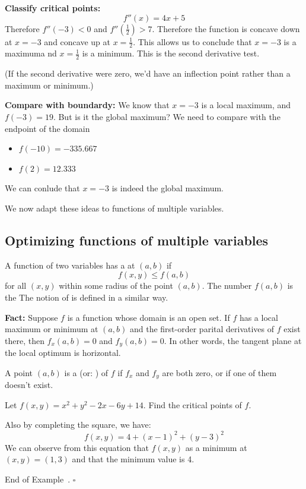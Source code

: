 \documentclass[10pt]{article}
\theoremstyle{definition}
\newtheorem{example}[theorem]{Example}
\renewenvironment{example}
{\begin{oldexample}}
  {\par\smallskip\hfill   End of Example~\theexample. $\square$    \par\end{oldexample}}
\newcommand{\vt}{\vskip 5mm} %
\newcommand{\Fl}{\vt\noindent\textbf} %
\newcommand{\1}[1]{\textbf{1}_{\left[#1\right]}} %
\newcommand{\dempfcolor}[1]{{\color{RoyalBlue}#1}}
\newcommand{\demph}[1]{\dempfcolor{{\sl #1}}}
\begin{document}
\Fl{Classify critical points:}
\begin{equation*}
  f''(x) = 4x+5
\end{equation*}
Therefore $f''(-3) <0$ and $f''(\frac{1}{2})> 7$. Therefore the function is
concave down at $x=-3$ and concave up at $x=\frac{1}{2}$. This allows us to
conclude that $x=-3$ is a maximuma nd $x=\frac{1}{2}$ is a minimum.  This is
the second derivative test.

(If the second derivative were zero, we'd have an inflection point rather than
a maximum or minimum.)


\Fl{Compare with boundardy:}
We know that $x=-3$ is a local maximum, and $f(-3) = 19$. But is it the global
maximum? We need to compare with the endpoint of the domain
\begin{itemize}
  \item $f(-10) = -335.667$
  \item $f(2) = 12.333$
\end{itemize}
We can conlude that $x=-3$ is indeed the global maximum.


We now adapt these ideas to functions of multiple variables.
\subsection{Optimizing functions of multiple variables}
A function of two variables has a \demph{local maximum} at $(a,b)$ if
\begin{equation*}
  f(x,y) \leq f(a,b)
\end{equation*}
for all $(x,y)$ within some radius of the point $(a,b)$. The number $f(a,b)$
is the \demph{local maximum value.} The notion of \demph{local minimum} is
defined in a similar way.

\Fl{Fact:} Suppose $f$ is a function whose domain is an open set. If $f$ has a
local maximum or minimum at $(a,b)$ and the first-order parital derivatives of
$f$ exist there, then $f_{x}(a,b)=0$ and $f_{y}(a,b) =0$. In other words, the
tangent plane at the local optimum is horizontal.


A point $(a,b)$ is a \demph{critical point} (or: \demph{stational point}) of
$f$ if $f_{x}$ and $f_{y}$ are both zero, or if one of them doesn't exist.

\begin{example}
  Let $f(x,y) = x^{2}+y^{2}-2x-6y+14$. Find the critical points of $f$.

  Also by completing the square, we have:
  \begin{equation*}
    f(x,y) = 4+(x-1)^{2}+(y-3)^{2}
  \end{equation*}
  We can observe from this equation that $f(x,y)$ as a minimum at $(x,y )
  =(1,3)$ and that the minimum value is 4.
\end{example}
\end{document}
